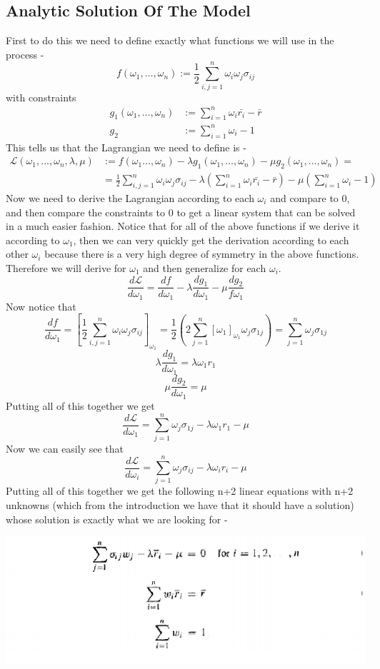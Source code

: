 \documentclass{article}
\begin{document}
\subsection{Analytic Solution Of The Model}
First to do this we need to define exactly what functions we will use in the process - 
\[f(\omega_1,\dots,\omega_n) := \frac{1}{2}\sum_{i,j=1}^n \omega_i\omega_j\sigma_{ij}\]
with constraints
\begin{align*}
g_1(\omega_1,\dots,\omega_n) &:= \sum_{i=1}^n \omega_i \bar{r_i} -\bar{r} \\ g_2&:=\sum_{i=1}^n \omega_i - 1
\end{align*}
This tells us that the Lagrangian we need to define is - 
\begin{align*}
    \mathcal{L}(\omega_1,\dots,\omega_n,\lambda,\mu)&:= f(\omega_1\dots,\omega_n)-\lambda g_1(\omega_1,\dots,\omega_n)-\mu g_2(\omega_1,\dots,\omega_n)= \\
    &=\frac{1}{2}\sum_{i,j=1}^n \omega_i\omega_j\sigma_{ij} - \lambda\left(\sum_{i=1}^n \omega_i \bar{r_i} -\bar{r}\right) - \mu\left(\sum_{i=1}^n \omega_i - 1\right)
\end{align*}
Now we need to derive the Lagrangian according to each $\omega_i$ and compare to 0, and then compare the constraints to 0 to get a linear system that can be solved in a much easier fashion. Notice that for all of the above functions if we derive it according to $\omega_1$, then we can very quickly get the derivation according to each other $\omega_i$ because there is a very high degree of symmetry in the above functions. Therefore we will derive for $\omega_1$ and then generalize for each $\omega_i$. 
\[\frac{d\mathcal{L}}{d\omega_1} = \frac{df}{d\omega_1} - \lambda \frac{dg_1}{d\omega_1}-\mu\frac{dg_2}{f\omega_1}\]
Now notice that
\[\frac{df}{d\omega_1} = \left[\frac{1}{2}\sum_{i,j=1}^n \omega_i\omega_j\sigma_{ij}\right]_{\omega_1} = \frac{1}{2}\left(2\sum_{j=1}^n [\omega_1]_{\omega_1}\omega_j\sigma_{1j}\right) = \sum_{j=1}^n \omega_j\sigma_{1j}\]
\[\lambda\frac{dg_1}{d\omega_1}=\lambda\omega_1 r_1\]
\[\mu\frac{dg_2}{d\omega_1} = \mu\]
Putting all of this together we get
\[\frac{d\mathcal{L}}{d\omega_1} = \sum_{j=1}^n \omega_j \sigma_{1j} - \lambda \omega_1 r_1 - \mu\]
Now we can easily see that 
\[\frac{d\mathcal{L}}{d\omega_i} = \sum_{j=1}^n \omega_j \sigma_{ij} - \lambda \omega_i r_i - \mu\]
Putting all of this together we get the following n+2 linear equations with n+2 unknowns (which from the introduction we have that it should have a solution) whose solution is exactly what we are looking for - \begin{center}
    \includegraphics[scale=0.8]{images/Sixth_Optimization_Photo.png}    
\end{center}
\end{document}
